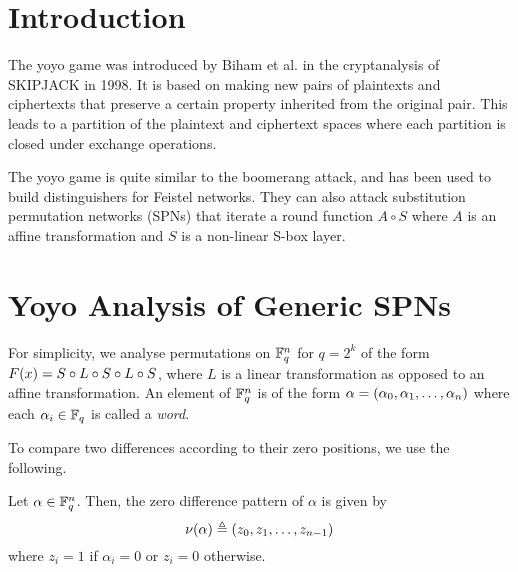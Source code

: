 \documentclass[twoside]{article}
\begin{document}



\section{Introduction}

The yoyo game was introduced by Biham et al. in the cryptanalysis of SKIPJACK in
1998. It is based on making new pairs of plaintexts and ciphertexts that
preserve a certain property inherited from the original pair. This leads to a
partition of the plaintext and ciphertext spaces where each partition is closed
under exchange operations. 

The yoyo game is quite similar to the boomerang attack, and has been used to
build distinguishers for Feistel networks. They can also attack substitution
permutation networks (SPNs) that iterate a round function \(A \circ S\) where
\(A\) is an affine transformation and \(S\) is a non-linear S-box layer. 

\section{Yoyo Analysis of Generic SPNs}

For simplicity, we analyse permutations on \(\mathbb F_q^n\) for \(q = 2^k\) of the
form \(F(x) = S \circ L \circ S \circ L \circ S\), where \(L\) is a linear
transformation as opposed to an affine transformation. An element of \(\mathbb F_q^n\)
is of the form \(\alpha = (\alpha_0, \alpha_1, \ldots, \alpha_n)\) where
each \(\alpha_i \in \mathbb F_q\) is called a \emph{word}.

To compare two differences according to their zero positions, we use the
following.

\begin{definition}
    \label{def:zero-diff}
    Let \(\alpha \in \mathbb F_q^n\). Then, the zero difference pattern of \(\alpha\)
    is given by
    \begin{equation}
        \nu(\alpha) \triangleq (z_0, z_1, \ldots, z_{n - 1})
        \label{eq:zero-diff}
    \end{equation}
    where \(z_i = 1\) if \(\alpha_i = 0\) or \(z_i = 0\) otherwise.
\end{definition}
\end{document}
